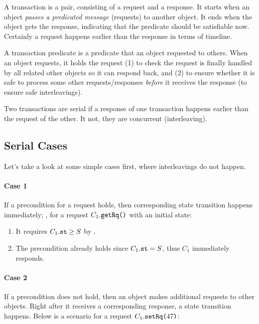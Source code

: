 \documentclass[format=manuscript]{acmart}
\begin{document}
\begin{definition}[Transaction]
  A transaction is a pair, consisting of a request and a response. It starts
  when an object \emph{passes a predicated message} (requests) to another
  object. It ends when the object gets the response, indicating that the
  predicate should be satisfiable now. Certainly a request happens earlier than
  the response in terms of timeline.
\end{definition}

\begin{definition}
  A transaction predicate is a predicate that an object requested to
  others. When an object requests, it holds the request (1) to check the request
  is finally handled by all related other objects so it can respond back, and
  (2) to ensure whether it is safe to process some other requests/responses
  \emph{before} it receives the response (to ensure safe interleavings).
\end{definition}

\begin{definition}
  Two transactions are serial if a response of one transaction happens earlier
  than the request of the other. It not, they are concurrent (interleaving).
\end{definition}

\subsection{Serial Cases}\label{serial-cases}

Let's take a look at some simple cases first, where interleavings do not happen.

\paragraph{Case 1}
If a precondition for a request holds, then corresponding state transition
happens immediately; \eg{}, for a request $C_1.\texttt{getRq()}$ with an initial
state:

\begin{enumerate}
\item It requires $C_1.\texttt{st} \geq S$ by .
\item The precondition already holds since $C_1.\texttt{st} = S$, thus $C_1$
  immediately responds.
\end{enumerate}

\paragraph{Case 2}
If a precondition does not hold, then an object makes additional requests to
other objects. Right after it receives a corresponding response, a state
transition happens. Below is a scenario for a request $C_1.\texttt{setRq(}47\texttt{)}$:
\end{document}

